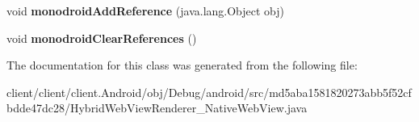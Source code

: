\begin{DoxyCompactItemize}
\item 
\hypertarget{classmd5aba1581820273abb5f52cfbdde47dc28_1_1HybridWebViewRenderer__NativeWebView_a63d555711afa324e919538fad1cfb91f}{}void {\bfseries monodroid\+Add\+Reference} (java.\+lang.\+Object obj)\label{classmd5aba1581820273abb5f52cfbdde47dc28_1_1HybridWebViewRenderer__NativeWebView_a63d555711afa324e919538fad1cfb91f}

\item 
\hypertarget{classmd5aba1581820273abb5f52cfbdde47dc28_1_1HybridWebViewRenderer__NativeWebView_a4b8103e12f6ee642f26668ac60756fbf}{}void {\bfseries monodroid\+Clear\+References} ()\label{classmd5aba1581820273abb5f52cfbdde47dc28_1_1HybridWebViewRenderer__NativeWebView_a4b8103e12f6ee642f26668ac60756fbf}

\end{DoxyCompactItemize}


The documentation for this class was generated from the following file\+:\begin{DoxyCompactItemize}
\item 
client/client/client.\+Android/obj/\+Debug/android/src/md5aba1581820273abb5f52cfbdde47dc28/Hybrid\+Web\+View\+Renderer\+\_\+\+Native\+Web\+View.\+java\end{DoxyCompactItemize}
